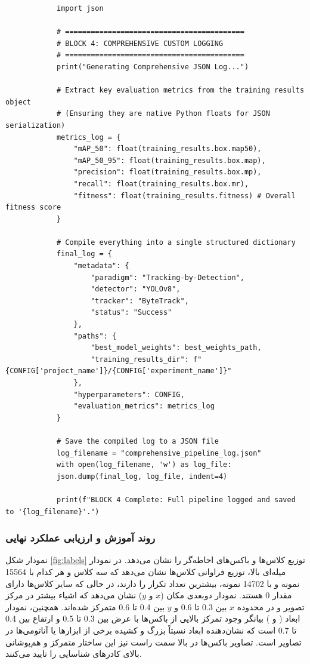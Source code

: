 \documentclass{article}
\begin{document}
\begin{latin}
	\begin{LTR}
		\begin{verbatim}
			import json
			
			# ==========================================
			# BLOCK 4: COMPREHENSIVE CUSTOM LOGGING
			# ==========================================
			print("Generating Comprehensive JSON Log...")
			
			# Extract key evaluation metrics from the training results object
			# (Ensuring they are native Python floats for JSON serialization)
			metrics_log = {
				"mAP_50": float(training_results.box.map50),
				"mAP_50_95": float(training_results.box.map),
				"precision": float(training_results.box.mp),
				"recall": float(training_results.box.mr),
				"fitness": float(training_results.fitness) # Overall fitness score
			}
			
			# Compile everything into a single structured dictionary
			final_log = {
				"metadata": {
					"paradigm": "Tracking-by-Detection",
					"detector": "YOLOv8",
					"tracker": "ByteTrack",
					"status": "Success"
				},
				"paths": {
					"best_model_weights": best_weights_path,
					"training_results_dir": f"{CONFIG['project_name']}/{CONFIG['experiment_name']}"
				},
				"hyperparameters": CONFIG,
				"evaluation_metrics": metrics_log
			}
			
			# Save the compiled log to a JSON file
			log_filename = "comprehensive_pipeline_log.json"
			with open(log_filename, 'w') as log_file:
			json.dump(final_log, log_file, indent=4)
			
			print(f"BLOCK 4 Complete: Full pipeline logged and saved to '{log_filename}'.")
		\end{verbatim}
	\end{LTR}
\end{latin}


\subsubsection{روند آموزش و ارزیابی عملکرد نهایی}
نمودار شکل \ref{fig:labels} توزیع کلاس‌ها و باکس‌های احاطه‌گر را نشان می‌دهد. در نمودار میله‌ای بالا، توزیع فراوانی کلاس‌ها نشان می‌دهد که سه کلاس  و  هر کدام با 15564 نمونه و  با 14702 نمونه، بیشترین تعداد تکرار را دارند، در حالی که سایر کلاس‌ها دارای مقدار 0 هستند. نمودار دوبعدی مکان ($x$ و $y$) نشان می‌دهد که اشیاء بیشتر در مرکز تصویر و در محدوده $x$ بین 0.3 تا 0.6 و $y$ بین 0.4 تا 0.6 متمرکز شده‌اند. همچنین، نمودار ابعاد ( و ) بیانگر وجود تمرکز بالایی از باکس‌ها با عرض بین 0.3 تا 0.5 و ارتفاع بین 0.4 تا 0.7 است که نشان‌دهنده ابعاد نسبتاً بزرگ و کشیده برخی از ابزارها یا آناتومی‌ها در تصاویر است. تصاویر باکس‌ها در بالا سمت راست نیز این ساختار متمرکز و هم‌پوشانی بالای کادرهای شناسایی را تایید می‌کنند.
\end{document}
